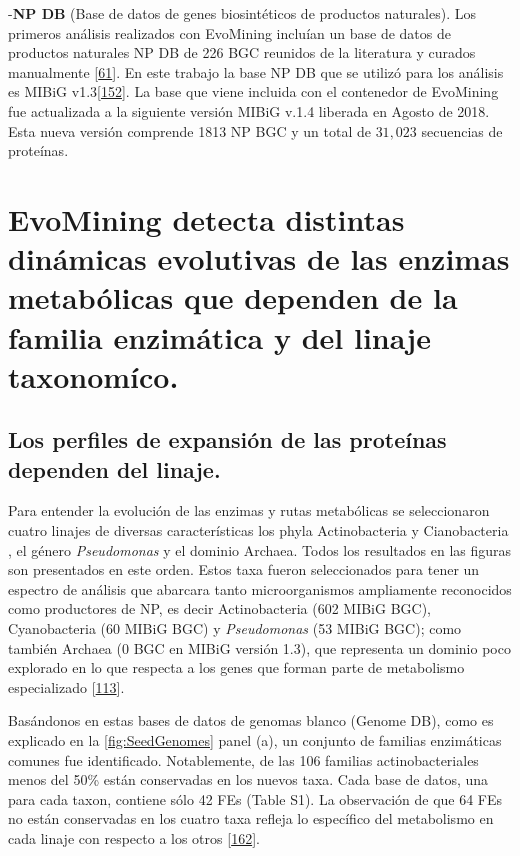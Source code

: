 \documentclass[12pt,twoside]{reedthesis}
\begin{document}
  -\textbf{NP DB} (Base de datos de genes biosintéticos de productos
  naturales). Los primeros análisis realizados con EvoMining incluían un
  base de datos de productos naturales NP DB de 226 BGC reunidos de la
  literatura y curados manualmente
  {[}\protect\hyperlink{ref-cruz-morales_phylogenomic_2016}{61}{]}. En
  este trabajo la base NP DB que se utilizó para los análisis es MIBiG
  v1.3{[}\protect\hyperlink{ref-medema_minimum_2015}{152}{]}. La base que
  viene incluida con el contenedor de EvoMining fue actualizada a la
  siguiente versión MIBiG v.1.4 liberada en Agosto de 2018. Esta nueva
  versión comprende 1813 NP BGC y un total de \(31,023\) secuencias de
  proteínas.
  
  \section{EvoMining detecta distintas dinámicas evolutivas de las enzimas
  metabólicas que dependen de la familia enzimática y del linaje
  taxonomíco.}\label{evomining-detecta-distintas-dinamicas-evolutivas-de-las-enzimas-metabolicas-que-dependen-de-la-familia-enzimatica-y-del-linaje-taxonomico.}
  
  \subsection{Los perfiles de expansión de las proteínas dependen del
  linaje.}\label{los-perfiles-de-expansion-de-las-proteinas-dependen-del-linaje.}
  
  Para entender la evolución de las enzimas y rutas metabólicas se
  seleccionaron cuatro linajes de diversas características los phyla
  Actinobacteria y Cianobacteria , el género \emph{Pseudomonas} y el
  dominio Archaea. Todos los resultados en las figuras son presentados en
  este orden. Estos taxa fueron seleccionados para tener un espectro de
  análisis que abarcara tanto microorganismos ampliamente reconocidos como
  productores de NP, es decir Actinobacteria (602 MIBiG BGC),
  Cyanobacteria (60 MIBiG BGC) y \emph{Pseudomonas} (53 MIBiG BGC); como
  también Archaea (0 BGC en MIBiG versión 1.3), que representa un dominio
  poco explorado en lo que respecta a los genes que forman parte de
  metabolismo especializado
  {[}\protect\hyperlink{ref-charlesworth_untapped_2015}{113}{]}.
  
  Basándonos en estas bases de datos de genomas blanco (Genome DB), como
  es explicado en la \autoref{fig:SeedGenomes} panel (a), un conjunto de
  familias enzimáticas comunes fue identificado. Notablemente, de las 106
  familias actinobacteriales menos del 50\% están conservadas en los
  nuevos taxa. Cada base de datos, una para cada taxon, contiene sólo 42
  FEs (Table S1). La observación de que 64 FEs no están conservadas en los
  cuatro taxa refleja lo específico del metabolismo en cada linaje con
  respecto a los otros
  {[}\protect\hyperlink{ref-jordan_lineage-specific_2001}{162}{]}.
  
\end{document}

